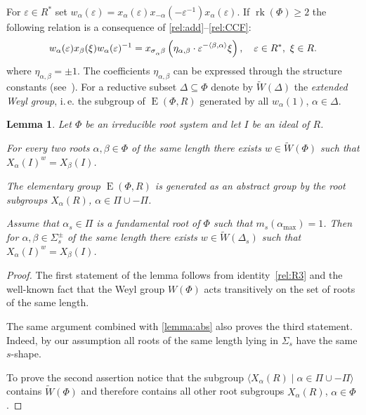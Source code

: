 \documentclass[oneside, 12pt]{amsart}
\theoremstyle{plain}
\numberwithin{equation}{section}
\newtheorem{lemma}{Lemma}
\numberwithin{lemma}{section}
\theoremstyle{definition}
\theoremstyle{remark}
\DeclareMathOperator{\E}{E}
\DeclareMathOperator{\rk}{rk}
\def\ssub#1{\mathchoice
   {_{\lower2pt\hbox{$\scriptstyle #1$}}}
   {_{\lower2pt\hbox{$\scriptstyle #1$}}}
   {_{\lower1.5pt\hbox{$\scriptscriptstyle #1$}}}
   {_{\!\lower1.5pt\hbox{$\scriptscriptstyle #1$}}}}
\begin{document}
For $\varepsilon\in R^*$ set $w_\alpha(\varepsilon) = x_\alpha(\varepsilon) x_{-\alpha}(-\varepsilon^{-1}) x_{\alpha}(\varepsilon).$
If $\rk(\Phi)\geqslant 2$ the following relation is a consequence of \eqref{rel:add}--\eqref{rel:CCF}:
\begin{equation}\label{rel:R3}
w_\alpha(\varepsilon) x_{\beta}(\xi) w_\alpha(\varepsilon)^{-1} =
x_{\sigma\ssub{\alpha}\beta} \left(\eta_{\alpha, \beta}\cdot\varepsilon^{-\langle\beta, \alpha \rangle}\xi\right), \quad \varepsilon\in R^*, \ \xi\in R.
\end{equation}
where $\eta_{\alpha, \beta}=\pm 1$. The coefficients $\eta_{\alpha, \beta}$ can be expressed through the structure constants (see~\cite[\S13]{VP}).
For a reductive subset $\Delta \subseteq \Phi$ denote by $\widetilde{W}(\Delta)$ the \emph{extended Weyl group}, i.\,e. the subgroup of $\E(\Phi, R)$ generated by all $w_{\alpha}(1)$, $\alpha \in \Delta$.
\begin{lemma} \label{lemma:weylfacts} Let $\Phi$ be an irreducible root system and let $I$ be an ideal of $R$. 
\begin{lemlist}
\item \label{item-trans1} For every two roots $\alpha, \beta \in \Phi$ of the same length there exists $w \in \widetilde{W}(\Phi)$ such that $X_{\alpha}(I)^w = X_\beta(I)$.
\item \label{item-egen} The elementary group $\E(\Phi, R)$  is generated as an abstract group by the root subgroups $X_{\alpha}(R)$, $\alpha \in \Pi \cup -\Pi$.
\item \label{item-trans2} Assume that $\alpha_s\in \Pi$ is a fundamental root of $\Phi$ such that $m_s(\alpha_\mathrm{max}) = 1$. 
                          Then for $\alpha, \beta \in \Sigma^\pm_s$ of the same length there exists $w\in \widetilde{W}(\Delta_s)$ such that $X_\alpha(I)^w = X_\beta(I)$. \end{lemlist}
\end{lemma}
\begin{proof}
The first statement of the lemma follows from identity~\eqref{rel:R3} and the well-known fact that the Weyl group $W(\Phi)$ acts transitively on the set of roots of the same length.
 
The same argument combined with \cref{lemma:abs} also proves the third statement. Indeed, by our assumption all roots of the same length lying in $\Sigma_s$ have the same $s$-shape.
 
To prove the second assertion notice that the subgroup $\langle X_\alpha(R) \mid \alpha \in \Pi \cup -\Pi \rangle$ contains $\widetilde{W}(\Phi)$ and therefore contains all other root subgroups $X_\alpha(R)$, $\alpha\in \Phi$. \end{proof}
\end{document}

